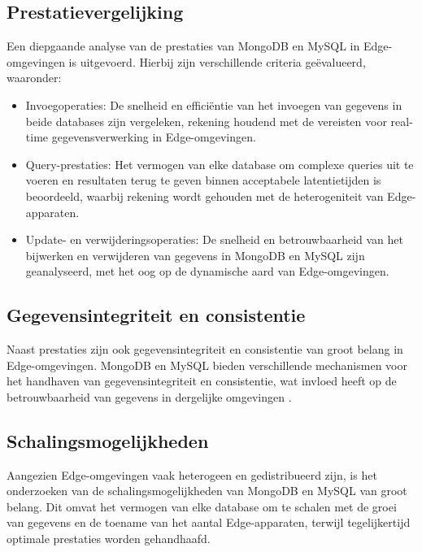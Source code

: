 \subsection{Prestatievergelijking}

Een diepgaande analyse van de prestaties van MongoDB en MySQL in Edge-omgevingen is uitgevoerd. Hierbij zijn verschillende criteria geëvalueerd, waaronder:

\begin{itemize}
    \item Invoegoperaties: De snelheid en efficiëntie van het invoegen van gegevens in beide databases zijn vergeleken, rekening houdend met de vereisten voor real-time gegevensverwerking in Edge-omgevingen.
    \item Query-prestaties: Het vermogen van elke database om complexe queries uit te voeren en resultaten terug te geven binnen acceptabele latentietijden is beoordeeld, waarbij rekening wordt gehouden met de heterogeniteit van Edge-apparaten.
    \item Update- en verwijderingsoperaties: De snelheid en betrouwbaarheid van het bijwerken en verwijderen van gegevens in MongoDB en MySQL zijn geanalyseerd, met het oog op de dynamische aard van Edge-omgevingen.
\end{itemize}

\subsection{Gegevensintegriteit en consistentie}

Naast prestaties zijn ook gegevensintegriteit en consistentie van groot belang in Edge-omgevingen. MongoDB en MySQL bieden verschillende mechanismen voor het handhaven van gegevensintegriteit en consistentie, wat invloed heeft op de betrouwbaarheid van gegevens in dergelijke omgevingen \autocite{Gyorodi2015comparative}.

\subsection{Schalingsmogelijkheden}

Aangezien Edge-omgevingen vaak heterogeen en gedistribueerd zijn, is het onderzoeken van de schalingsmogelijkheden van MongoDB en MySQL van groot belang. Dit omvat het vermogen van elke database om te schalen met de groei van gegevens en de toename van het aantal Edge-apparaten, terwijl tegelijkertijd optimale prestaties worden gehandhaafd.

